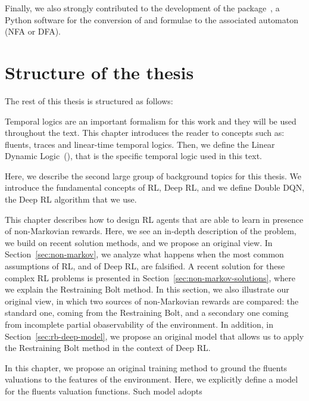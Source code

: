 Finally, we also strongly contributed to the development of the 
package~\cite{bib:flloat}, a Python software for the conversion of \ltl{} and
\ldl{} formulae to the associated automaton (NFA or DFA).


\section{Structure of the thesis}

The rest of this thesis is structured as follows:
\begin{description}[style=nextline]
	\item[\ref{ch:logics}~--~\nameref{ch:logics}]
		Temporal logics are an important formalism for this work and they will be
		used throughout the text. This chapter introduces the reader to concepts
		such as: fluents, traces and linear-time temporal logics. Then, we define
		the Linear Dynamic Logic~(\ldl{}), that is the specific temporal logic
		used in this text.
	\item[\ref{ch:rl}~--~\nameref{ch:rl}]
		Here, we describe the second large group of background topics for this
		thesis. We introduce the fundamental concepts of RL, Deep RL, and we
		define Double DQN, the Deep RL algorithm that we use.
	\item[\ref{ch:nonmarkovrl}~--~\nameref{ch:nonmarkovrl}]
		This chapter describes how to design RL agents that are able to learn in
		presence of non-Markovian rewards. Here, we see an in-depth description of
		the problem, we build on recent solution methods, and we propose an
		original view. In Section~\ref{sec:non-markov}, we analyze what happens
		when the most common assumptions of RL, and of Deep RL, are falsified. A
		recent solution for these complex RL problems is presented in
		Section~\ref{sec:non-markov-solutions}, where we explain the Restraining
		Bolt method. In this section, we also illustrate our original view, in
		which two sources of non-Markovian rewards are compared: the standard one,
		coming from the Restraining Bolt, and a secondary one coming from
		incomplete partial obaservability of the environment.  In addition, in
		Section~\ref{sec:rb-deep-model}, we propose an original model that allows
		us to apply the Restraining Bolt method in the context of Deep RL.
	\item[\ref{ch:fluents}~--~\nameref{ch:fluents}]
		In this chapter, we propose an original training method to ground the
		fluents valuations to the features of the environment. Here, we explicitly
		define a model for the fluents valuation functions. Such model adopts

\end{description}
